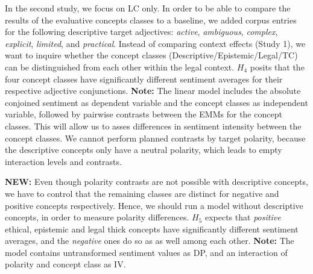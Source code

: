 \documentclass{report}
\begin{document}
In the second study, we focus on LC only. In order to be able to compare the results of the evaluative concepts classes to a baseline, we added corpus entries for the following descriptive target adjectives: \textit{active}, \textit{ambiguous}, \textit{complex}, \textit{explicit}, \textit{limited}, and \textit{practical}. Instead of comparing context effects (Study 1), we want to inquire whether the concept classes (Descriptive/Epistemic/Legal/TC) can be distinguished from each other within the legal context. $H_4$ posits that the four concept classes have significantly different sentiment averages for their respective adjective conjunctions. \textbf{Note:} The linear model includes the absolute conjoined sentiment as dependent variable and the concept classes as independent variable, followed by pairwise contrasts between the EMMs for the concept classes. This will allow us to asses differences in sentiment intensity between the concept classes. 
We cannot perform planned contrasts by target polarity, because the descriptive concepts only have a neutral polarity, which leads to empty interaction levels and contrasts.

\textbf{NEW:} Even though polarity contrasts are not possible with descriptive concepts, we have to control that the remaining classes are distinct for negative and positive concepts respectively. Hence, we should run a model without descriptive concepts, in order to measure polarity differences. $H_5$ expects that \textit{positive} ethical, epistemic and legal thick concepts have significantly different sentiment averages, and the \textit{negative} ones do so as as well among each other.  \textbf{Note:} The model contains untransformed sentiment values as DP, and an interaction of polarity and concept class as IV.
\end{document}
